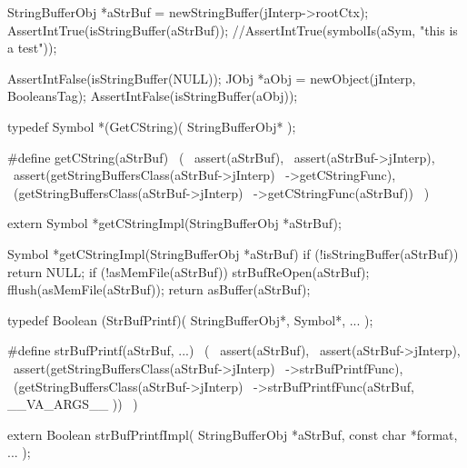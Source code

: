 
\startCTest
  StringBufferObj *aStrBuf = newStringBuffer(jInterp->rootCtx);
  AssertIntTrue(isStringBuffer(aStrBuf));
  //AssertIntTrue(symbolIs(aSym, "this is a test"));
\stopCTest
\stopTestCase

\startCTest
  AssertIntFalse(isStringBuffer(NULL));
  JObj *aObj = newObject(jInterp, BooleansTag);
  AssertIntFalse(isStringBuffer(aObj));
\stopCTest
\stopTestCase
\stopTestSuite


\startCHeader
typedef Symbol *(GetCString)(
  StringBufferObj*
);

#define getCString(aStrBuf)                         \
  (                                                 \
    assert(aStrBuf),                                \
    assert(aStrBuf->jInterp),                       \
    assert(getStringBuffersClass(aStrBuf->jInterp)  \
      ->getCStringFunc),                            \
    (getStringBuffersClass(aStrBuf->jInterp)        \
      ->getCStringFunc(aStrBuf))                    \
  )
\stopCHeader

\setCHeaderStream{private}
\startCHeader
extern Symbol *getCStringImpl(StringBufferObj *aStrBuf);
\stopCHeader
\setCHeaderStream{public}

\startCCode
Symbol *getCStringImpl(StringBufferObj *aStrBuf) {
  if (!isStringBuffer(aStrBuf)) return NULL;
  if (!asMemFile(aStrBuf)) strBufReOpen(aStrBuf);
  fflush(asMemFile(aStrBuf));
  return asBuffer(aStrBuf);
}
\stopCCode

\stopTestSuite

\startTestSuite[strBufPrintf]

\startCHeader
typedef Boolean (StrBufPrintf)(
  StringBufferObj*,
  Symbol*,
  ...
);

#define strBufPrintf(aStrBuf, ...)                  \
  (                                                 \
    assert(aStrBuf),                                \
    assert(aStrBuf->jInterp),                       \
    assert(getStringBuffersClass(aStrBuf->jInterp)  \
      ->strBufPrintfFunc),                          \
    (getStringBuffersClass(aStrBuf->jInterp)        \
      ->strBufPrintfFunc(aStrBuf, __VA_ARGS__ ))    \
  )
\stopCHeader

\startCHeader
extern Boolean strBufPrintfImpl(
  StringBufferObj   *aStrBuf,
  const char        *format, 
  ...
);
\stopCHeader
\setCHeaderStream{public}

